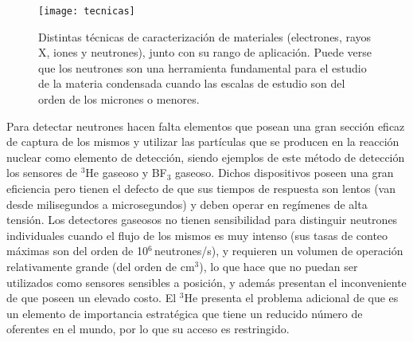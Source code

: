 \begin{figure}[tbh!]
 \begin{center}
    \texttt{[image: tecnicas]}
\caption[Distintas técnicas de caracterización de materiales (electrones, rayos X, iones y neutrones), junto con su rango de aplicación.]{Distintas técnicas de caracterización de materiales (electrones, rayos X, iones y neutrones), junto con
su rango de aplicación. Puede verse que los neutrones son una herramienta fundamental para el estudio
de la materia condensada cuando las escalas de estudio son del orden de los micrones o menores.}
\label{fig:tecnica}  
\end{center}
\end{figure} 

Para detectar neutrones hacen falta elementos que posean una gran sección eficaz de captura de los mismos y utilizar las partículas que se producen en la reacción nuclear como elemento de detección\cite{knoll}, siendo ejemplos de este método de detección los sensores de $^3$He gaseoso y BF$_3$ gaseoso\cite{knoll}. Dichos dispositivos poseen una gran eficiencia pero tienen el defecto de que sus tiempos de respuesta son lentos (van desde milisegundos a microsegundos) y deben operar en regímenes de alta tensión\cite{knoll}. Los detectores gaseosos no tienen sensibilidad para distinguir neutrones individuales cuando el flujo de los mismos es muy intenso (sus tasas de conteo máximas son del orden de 10$^6$\,neutrones/s)\cite{knoll}, y requieren un volumen de operación relativamente grande (del orden de cm$^3$), lo que hace que no puedan ser utilizados como sensores sensibles a posición\cite{knoll}, y además presentan el inconveniente de que poseen un elevado costo\cite{knoll}. El $^3$He presenta el problema adicional de que es un elemento de importancia estratégica que tiene un reducido número de oferentes en el mundo, por lo que su acceso es restringido.

